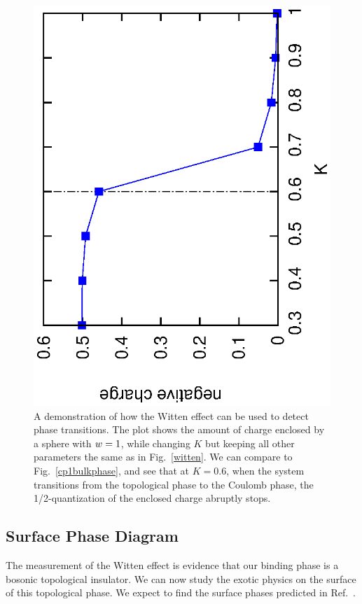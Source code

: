 \begin{figure}
\includegraphics[angle=-90,width=0.6\linewidth]{figures/wittenphase.eps}
\caption{A demonstration of how the Witten effect can be used to detect phase transitions. The plot shows the amount of charge enclosed by a sphere with $\scripty{r}=1$, while changing $K$ but keeping all other parameters the same as in Fig.~\ref{witten}. We can compare to Fig.~\ref{cp1bulkphase}, and see that at $K=0.6$, when the system transitions from the topological phase to the Coulomb phase, the 1/2-quantization of the enclosed charge abruptly stops.}
\label{wittenphase}
\end{figure}


\subsection{Surface Phase Diagram}
\label{subsec::cp1surface}
The measurement of the Witten effect is evidence that our binding phase is a bosonic topological insulator. We can now study the exotic physics on the surface of this topological phase. We expect to find the surface phases predicted in Ref.~\cite{SenthilVishwanath}.

